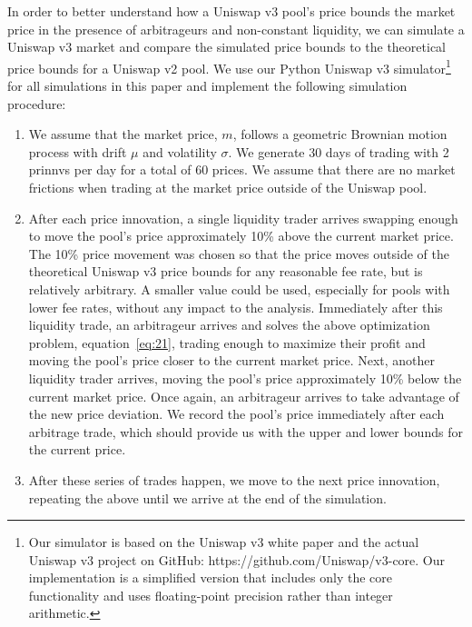 \documentclass[11pt]{article}
\begin{document}
In order to better understand how a Uniswap v3 pool's price bounds the market price in the presence of arbitrageurs and non-constant liquidity, we can simulate a Uniswap v3 market and compare the simulated price bounds to the theoretical price bounds for a Uniswap v2 pool. We use our Python Uniswap v3 simulator\footnote{Our simulator is based on the Uniswap v3 white paper and the actual Uniswap v3 project on GitHub: https://github.com/Uniswap/v3-core. Our implementation is a simplified version that includes only the core functionality and uses floating-point precision rather than integer arithmetic.} for all simulations in this paper and implement the following simulation procedure:
\begin{enumerate}
    \item We assume that the market price, $m$, follows a geometric Brownian motion process with drift $\mu$ and volatility $\sigma$. We generate 30 days of trading with 2 \glspl{prinnv} per day for a total of 60 prices. We assume that there are no market frictions when trading at the market price outside of the Uniswap pool.

    \item After each price innovation, a single liquidity trader arrives swapping enough to move the pool's price approximately 10\% above the current market price. The 10\% price movement was chosen so that the price moves outside of the theoretical Uniswap v3 price bounds for any reasonable fee rate, but is relatively arbitrary. A smaller value could be used, especially for pools with lower fee rates, without any impact to the analysis. Immediately after this liquidity trade, an arbitrageur arrives and solves the above optimization problem, equation~\eqref{eq:21}, trading enough to maximize their profit and moving the pool's price closer to the current market price. Next, another liquidity trader arrives, moving the pool's price approximately 10\% below the current market price. Once again, an arbitrageur arrives to take advantage of the new price deviation. We record the pool's price immediately after each arbitrage trade, which should provide us with the upper and lower bounds for the current price.

    \item After these series of trades happen, we move to the next price innovation, repeating the above until we arrive at the end of the simulation.
\end{enumerate}
\end{document}
